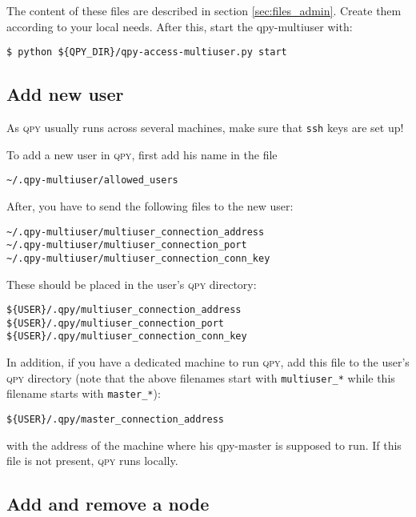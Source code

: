 \documentclass[a4paper,12pt]{article}
\newcommand{\qpy}{\textsc{qpy}}
\begin{document}
The content of these files are described in section \ref{sec:files_admin}.
Create them according to your local needs.
After this, start the qpy-multiuser with:

\begin{lstlisting}[style=BashStyle]
$ python ${QPY_DIR}/qpy-access-multiuser.py start
\end{lstlisting}


\subsection{Add new user}

As \qpy{} usually runs across several machines, make sure that \texttt{ssh} keys are set up! 

To add a new user in \qpy{}, first add his name in the file

\begin{verbatim}
~/.qpy-multiuser/allowed_users
\end{verbatim}

After, you have to send the following files to the new user:

\begin{verbatim}
~/.qpy-multiuser/multiuser_connection_address
~/.qpy-multiuser/multiuser_connection_port
~/.qpy-multiuser/multiuser_connection_conn_key
\end{verbatim}

These should be placed in the user's \qpy{} directory:

\begin{verbatim}
${USER}/.qpy/multiuser_connection_address
${USER}/.qpy/multiuser_connection_port
${USER}/.qpy/multiuser_connection_conn_key
\end{verbatim}

In addition, if you have a dedicated machine to run \qpy{}, add this file to the user's \qpy{} directory (note that the above filenames start with \verb+multiuser_*+ while this filename starts with \verb+master_*+):

\begin{verbatim}
${USER}/.qpy/master_connection_address
\end{verbatim}

with the address of the machine where his qpy-master is supposed to run.
If this file is not present, \qpy{} runs locally.

\subsection{Add and remove a node}
\end{document}
